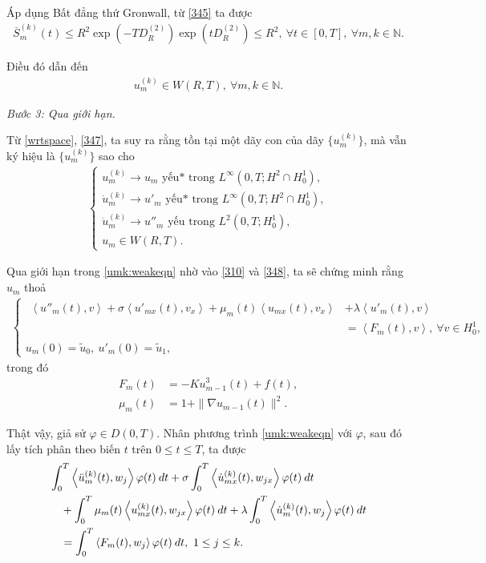 \documentclass[12pt,a4paper]{article}
\def\N{\mathbb{N}}
\theoremstyle{definition}
\theoremstyle{definition}
\begin{document}
Áp dụng Bất đẳng thứ Gronwall, từ \eqref{345} ta được
\begin{align}
    \overline{S}_m^{(k)}(t) \le R^2 \exp\left(-TD_R^{(2)}\right) \exp\left(tD_R^{(2)}\right) \le R^2, \ \forall t \in [0,T],\ \forall m,k \in \N.
\end{align}

Điều đó dẫn đến
\begin{align} \label{347}
    u_m^{(k)} \in W(R,T),\ \forall m,k \in \N.
\end{align}

\textit{Bước 3: Qua giới hạn.}

Từ \eqref{wrtspace}, \eqref{347}, ta suy ra rằng tồn tại một dãy con của dãy $\{u_m^{(k)}\}$, mà vẫn ký hiệu là $\{u_m^{(k)}\}$ sao cho
\begin{align} \label{348}
    \begin{cases}
        u_m^{(k)} \to u_m \text{ yếu* trong } L^\infty (0,T;H^2 \cap H^1_0), \\
        \dot{u}_m^{(k)} \to u'_m \text{ yếu* trong } L^\infty (0,T;H^2 \cap H^1_0), \\
        \ddot{u}_m^{(k)} \to u''_m \text{ yếu trong } L^2 (0,T;H^1_0), \\
        u_m \in W(R,T).
    \end{cases}
\end{align}

Qua giới hạn trong \eqref{umk:weakeqn} nhờ vào \eqref{310} và \eqref{348}, ta sẽ chứng minh rằng $u_m$ thoả
\begin{align} \label{349}
    \begin{cases}
        \begin{aligned}
            \left< u''_m(t), v\right> + \sigma \left< u'_{mx}(t), v_x \right>
            + \mu_m(t) \left<u_{mx}(t), v_x \right> &+ \lambda \left<u'_m(t), v\right> \\
            &= \left<F_m(t), v \right>,\ \forall v \in H^1_0,
        \end{aligned} \\
        u_m(0) = \tilde{u}_0,\: u'_m(0) = \tilde{u}_1,
    \end{cases}
\end{align}
trong đó
\begin{align*}
    F_m(t) &= -Ku^3_{m-1}(t) + f(t), \\
    \mu_m(t) &= 1 + \|\nabla u_{m-1}(t)\|^2.
\end{align*}

Thật vậy, giả sử $\varphi \in D(0,T)$. Nhân phương trình \eqref{umk:weakeqn} với $\varphi$, sau đó lấy tích phân theo biến $t$ trên $0 \le t \le T$, ta được
\begin{align} \label{350}
    &\int_0^T \left<\ddot{u}_m^{(k)}(t), w_j\right> \varphi(t)\:dt
    + \sigma \int_0^T \left<\dot{u}_{mx}^{(k)}(t), w_{jx}\right> \varphi(t)\:dt \notag \\
    &\quad + \int_0^T \mu_m(t) \left<u_{mx}^{(k)}(t), w_{jx}\right>\varphi(t)\:dt
    + \lambda \int_0^T \left<\dot{u}_m^{(k)}(t), w_j\right> \varphi(t)\:dt \\
    &\quad = \int_0^T \left< F_m(t), w_j \right> \varphi(t)\:dt, \ 1 \le j \le k. \notag
\end{align}
\end{document}

